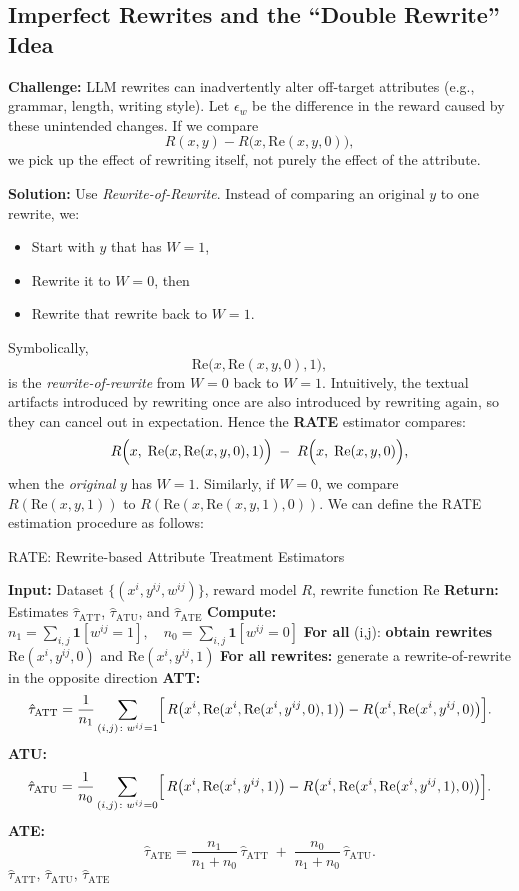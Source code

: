 \documentclass{article}
\theoremstyle{definition}
\begin{document}
\subsection{Imperfect Rewrites and the ``Double Rewrite'' Idea}

\textbf{Challenge:} LLM rewrites can inadvertently alter off-target attributes (e.g., grammar, length, writing style). Let $\epsilon_w$ be the difference in the reward caused by these unintended changes. If we compare
\[
R(x, y) - R\bigl(x, \text{Re}(x,y,0)\bigr),
\]
we pick up the effect of rewriting itself, not purely the effect of the attribute.

\textbf{Solution:} Use \emph{Rewrite-of-Rewrite}. Instead of comparing an original $y$ to one rewrite, we:
\begin{itemize}
    \item Start with $y$ that has $W=1$,
    \item Rewrite it to $W=0$, then
    \item Rewrite that rewrite back to $W=1$.
\end{itemize}
Symbolically, 
\[
\text{Re}\bigl(x,\text{Re}(x,y,0),1\bigr),
\]
is the \emph{rewrite-of-rewrite} from $W=0$ back to $W=1$. Intuitively, the textual artifacts introduced by rewriting once are also introduced by rewriting again, so they can cancel out in expectation. Hence the \textbf{RATE} estimator compares:
\[
R\Bigl(x,\;\text{Re}(x, \text{Re}(x,y,0),1)\Bigr) \;-\;
R\Bigl(x,\;\text{Re}(x,y,0)\Bigr),
\]
when the \emph{original} $y$ has $W=1$. Similarly, if $W=0$, we compare $R(\text{Re}(x,y,1))$ to $R(\text{Re}(x, \text{Re}(x,y,1),0))$. We can define the RATE estimation procedure as follows:
\begin{algorithm}[H]
  \caption{RATE: Rewrite-based Attribute Treatment Estimators}
  \label{alg:rate}
  \begin{algorithmic}[1]
  \State \textbf{Input:} Dataset $\{(x^i, y^{ij}, w^{ij})\}$, reward model $R$, rewrite function $\text{Re}$
  \State \textbf{Return:} Estimates $\hat{\tau}_{\text{ATT}}$, $\hat{\tau}_{\text{ATU}}$, and $\hat{\tau}_{\text{ATE}}$
  \State \textbf{Compute:} $n_1 = \sum_{i,j} \mathbf{1}[w^{ij}=1], \quad n_0 = \sum_{i,j} \mathbf{1}[w^{ij}=0]$
  \State \textbf{For all }(i,j): \textbf{obtain rewrites} $\text{Re}(x^i, y^{ij}, 0)$ and $\text{Re}(x^i, y^{ij}, 1)$
  \State \textbf{For all rewrites:} generate a rewrite-of-rewrite in the opposite direction
  \State \textbf{ATT:}
  \[
    \hat{\tau}_{\text{ATT}} = \frac{1}{n_1} \sum_{(i,j)\colon w^{ij}=1} \Bigl[\,R\bigl(x^i, \text{Re}(x^i, \text{Re}(x^i, y^{ij},0),1)\bigr) - R\bigl(x^i,\text{Re}(x^i, y^{ij},0)\bigr)\Bigr].
  \]
  \State \textbf{ATU:}
  \[
    \hat{\tau}_{\text{ATU}} = \frac{1}{n_0} \sum_{(i,j)\colon w^{ij}=0} \Bigl[\,R\bigl(x^i, \text{Re}(x^i, y^{ij},1)\bigr) - R\bigl(x^i,\text{Re}(x^i, \text{Re}(x^i, y^{ij},1),0)\bigr)\Bigr].
  \]
  \State \textbf{ATE: }
  \[
    \hat{\tau}_{\text{ATE}} = 
    \frac{n_1}{n_1+n_0}\,\hat{\tau}_{\text{ATT}}
    \;+\;
    \frac{n_0}{n_1+n_0}\,\hat{\tau}_{\text{ATU}}.
  \]
  \State \Return $\hat{\tau}_{\text{ATT}}, \,\hat{\tau}_{\text{ATU}}, \,\hat{\tau}_{\text{ATE}}$
  \end{algorithmic}
\end{algorithm}
\end{document}
